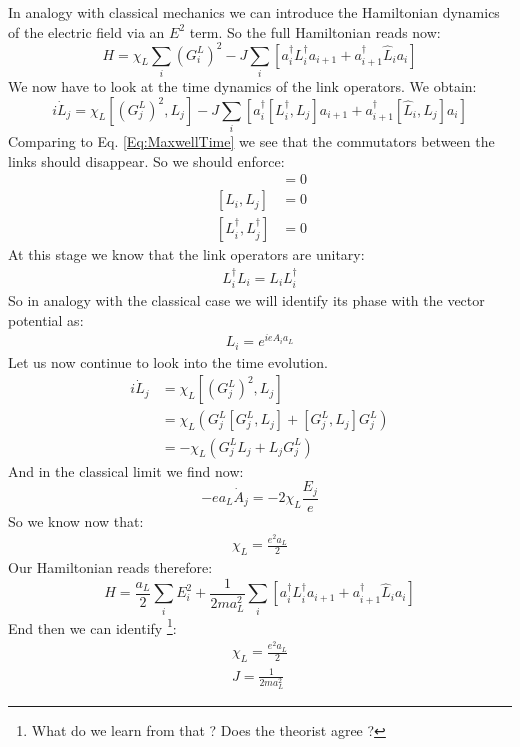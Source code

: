 \documentclass[10pt]{article}
\newcommand{\ch}{e}
\newcommand{\aL}{a_L}
\begin{document}
 In analogy with classical mechanics we can introduce the Hamiltonian dynamics of the electric field via an $E^2$ term. So the full Hamiltonian reads now:
 \begin{equation}
  H = \chi_L \sum_i (G^L_i)^2 - J\sum_i \left[a_i^\dag L^\dag_i a_{i+1} +a_{i+1}^\dag \hat{L}_i a_i \right]
 \end{equation}
We now have to look at the time dynamics of the link operators. We obtain:
\begin{equation}
i\dot{L}_j = \chi_L [(G^L_j)^2,L_j] - J\sum_i \left[a_i^\dag [L^\dag_i,L_j] a_{i+1} +a_{i+1}^\dag [\hat{L}_i,L_j] a_i \right]\nonumber
\end{equation}
Comparing to Eq. \eqref{Eq:MaxwellTime} we see that the commutators between the links should disappear. So we should enforce:
\begin{eqnarray}
 [L^\dag_i,L_j]  &= 0\\
 ~[L_i,L_j]  &= 0\\
 ~[L^\dag_i,L^\dag_j]  &= 0
\end{eqnarray}
At this stage we know that the link operators are unitary:
\begin{align}
L_i^\dag L_i = L_i L_i^\dag
\end{align}
So in analogy with the classical case we will identify its phase with the vector potential as:
\begin{align}
L_i = e^{i\ch A_i \aL}
\end{align}
Let us now continue to look into the time evolution.
\begin{eqnarray}
i\dot{L}_j &= \chi_L [(G^L_j)^2,L_j] \\
&=\chi_L \left(G^L_j[G^L_j,L_j]+[G^L_j,L_j]G^L_j\right)\\
&= -\chi_L \left(G^L_jL_j+L_jG^L_j\right)
\end{eqnarray}
And in the classical limit we find now:
\begin{equation}
-\ch \aL \dot{A}_j = -2\chi_L  \frac{E_j}{\ch}
\end{equation}
 So we know now that:
\begin{align}
 \chi_L= \frac{\ch^2 \aL}{2}
\end{align}
Our Hamiltonian reads therefore:
\begin{equation}
H = \frac{\aL}{2} \sum_i E_i^2 + \frac{1}{2m a_L^2}\sum_i \left[a_i^\dag L^\dag_i a_{i+1} +a_{i+1}^\dag \hat{L}_i a_i \right]
\end{equation}
End then we can identify
\footnote{What do we learn from that ? Does the theorist agree ?}:
\begin{eqnarray}
\chi_L= \frac{\ch^2 \aL}{2}\\
J= \frac{1}{2ma_L^2}
\end{eqnarray}
\end{document}
